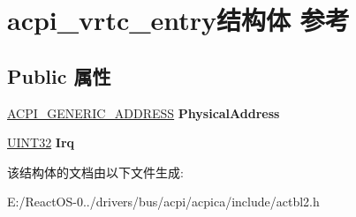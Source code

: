 \hypertarget{structacpi__vrtc__entry}{}\section{acpi\+\_\+vrtc\+\_\+entry结构体 参考}
\label{structacpi__vrtc__entry}
\subsection*{Public 属性}
\begin{DoxyCompactItemize}
\item 
\mbox{\label{structacpi__vrtc__entry_a3b68057f994fb7555cbebc21fb542115}} 
\hyperlink{structacpi__generic__address}{A\+C\+P\+I\+\_\+\+G\+E\+N\+E\+R\+I\+C\+\_\+\+A\+D\+D\+R\+E\+SS} {\bfseries Physical\+Address}
\item 
\mbox{\label{structacpi__vrtc__entry_a413a2590d3986f02a5eb01c74c420473}} 
\hyperlink{_processor_bind_8h_ae1e6edbbc26d6fbc71a90190d0266018}{U\+I\+N\+T32} {\bfseries Irq}
\end{DoxyCompactItemize}


该结构体的文档由以下文件生成\+:\begin{DoxyCompactItemize}
\item 
E\+:/\+React\+O\+S-\/0../drivers/bus/acpi/acpica/include/actbl2.\+h\end{DoxyCompactItemize}
